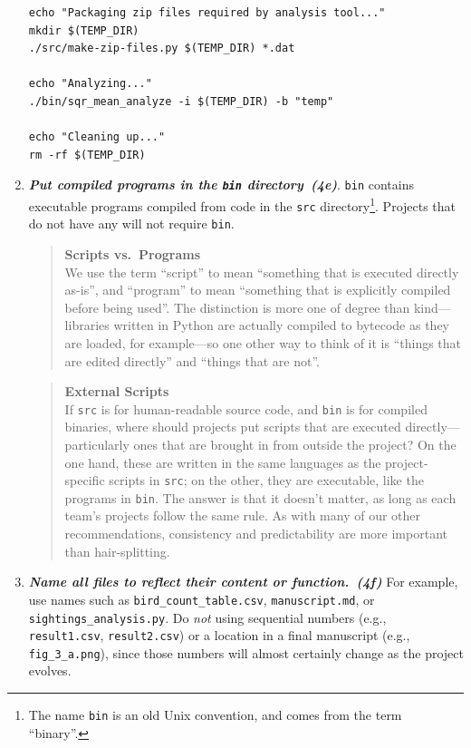 \documentclass[10pt,letterpaper]{article}
\newcommand{\practice}[2]{\textbf{\emph{{#2}~({#1})}}}
\begin{document}
\begin{enumerate}
{\begin{verbatim}
echo "Packaging zip files required by analysis tool..."
mkdir $(TEMP_DIR)
./src/make-zip-files.py $(TEMP_DIR) *.dat

echo "Analyzing..."
./bin/sqr_mean_analyze -i $(TEMP_DIR) -b "temp"

echo "Cleaning up..."
rm -rf $(TEMP_DIR)
\end{verbatim}
}

\item

  \practice{4e}{Put compiled programs in the \texttt{bin} directory}.
  \texttt{bin} contains executable programs compiled from code in the
  \texttt{src} directory\footnote{The name \texttt{bin} is an old Unix
  convention, and comes from the term ``binary''.}. Projects that
  do not have any will not require \texttt{bin}.

  \begin{quote}
    \noindent \textbf{Scripts vs.\ Programs}
    \\
    We use the term ``script'' to mean ``something that is executed
    directly as-is'', and ``program'' to mean ``something that is
    explicitly compiled before being used''.  The distinction is more
    one of degree than kind---libraries written in Python are actually
    compiled to bytecode as they are loaded, for example---so one
    other way to think of it is ``things that are edited directly''
    and ``things that are not''.
  \end{quote}

  \begin{quote}
    \noindent \textbf{External Scripts}
    \\
    If \texttt{src} is for human-readable source code, and
    \texttt{bin} is for compiled binaries, where should projects put
    scripts that are executed directly---particularly ones that are
    brought in from outside the project?  On the one hand, these are
    written in the same languages as the project-specific scripts in
    \texttt{src}; on the other, they are executable, like the programs
    in \texttt{bin}.  The answer is that it doesn't matter, as long as
    each team's projects follow the same rule.  As with many of our
    other recommendations, consistency and predictability are more
    important than hair-splitting.
  \end{quote}

\item

  \practice{4f}{Name all files to reflect their content or function.}
  For example, use names such as \texttt{bird\_count\_table.csv},
  \texttt{manuscript.md}, or \texttt{sightings\_analysis.py}.  Do
  \emph{not} using sequential numbers (e.g., \texttt{result1.csv},
  \texttt{result2.csv}) or a location in a final manuscript (e.g.,
  \texttt{fig\_3\_a.png}), since those numbers will almost certainly
  change as the project evolves.

\end{enumerate}
\end{document}
